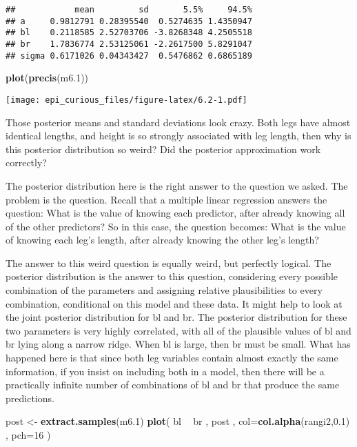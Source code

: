\documentclass[
]{article}
\newenvironment{Shaded}{\begin{snugshade}}{\end{snugshade}}
\newcommand{\DataTypeTok}[1]{\textcolor[rgb]{0.13,0.29,0.53}{#1}}
\newcommand{\DecValTok}[1]{\textcolor[rgb]{0.00,0.00,0.81}{#1}}
\newcommand{\FloatTok}[1]{\textcolor[rgb]{0.00,0.00,0.81}{#1}}
\newcommand{\KeywordTok}[1]{\textcolor[rgb]{0.13,0.29,0.53}{\textbf{#1}}}
\newcommand{\NormalTok}[1]{#1}
\newcommand{\OperatorTok}[1]{\textcolor[rgb]{0.81,0.36,0.00}{\textbf{#1}}}
\newcommand{\StringTok}[1]{\textcolor[rgb]{0.31,0.60,0.02}{#1}}
\begin{document}
\begin{verbatim}
##            mean         sd       5.5%     94.5%
## a     0.9812791 0.28395540  0.5274635 1.4350947
## bl    0.2118585 2.52703706 -3.8268348 4.2505518
## br    1.7836774 2.53125061 -2.2617500 5.8291047
## sigma 0.6171026 0.04343427  0.5476862 0.6865189
\end{verbatim}

\begin{Shaded}
\begin{Highlighting}[]
\KeywordTok{plot}\NormalTok{(}\KeywordTok{precis}\NormalTok{(m6}\FloatTok{.1}\NormalTok{))}
\end{Highlighting}
\end{Shaded}

\texttt{[image: epi\_curious\_files/figure-latex/6.2-1.pdf]}

Those posterior means and standard deviations look crazy. Both legs have
almost identical lengths, and height is so strongly associated with leg
length, then why is this posterior distribution so weird? Did the
posterior approximation work correctly?

The posterior distribution here is the right answer to the question we
asked. The problem is the question. Recall that a multiple linear
regression answers the question: What is the value of knowing each
predictor, after already knowing all of the other predictors? So in this
case, the question becomes: What is the value of knowing each leg's
length, after already knowing the other leg's length?

The answer to this weird question is equally weird, but perfectly
logical. The posterior distribution is the answer to this question,
considering every possible combination of the parameters and assigning
relative plausibilities to every combination, conditional on this model
and these data. It might help to look at the joint posterior
distribution for bl and br. The posterior distribution for these two
parameters is very highly correlated, with all of the plausible values
of bl and br lying along a narrow ridge. When bl is large, then br must
be small. What has happened here is that since both leg variables
contain almost exactly the same information, if you insist on including
both in a model, then there will be a practically infinite number of
combinations of bl and br that produce the same predictions.

\begin{Shaded}
\begin{Highlighting}[]
\NormalTok{post <-}\StringTok{ }\KeywordTok{extract.samples}\NormalTok{(m6}\FloatTok{.1}\NormalTok{)}
\KeywordTok{plot}\NormalTok{( bl }\OperatorTok{~}\StringTok{ }\NormalTok{br , post , }\DataTypeTok{col=}\KeywordTok{col.alpha}\NormalTok{(rangi2,}\FloatTok{0.1}\NormalTok{) , }\DataTypeTok{pch=}\DecValTok{16}\NormalTok{ )}
\end{Highlighting}
\end{Shaded}
\end{document}
